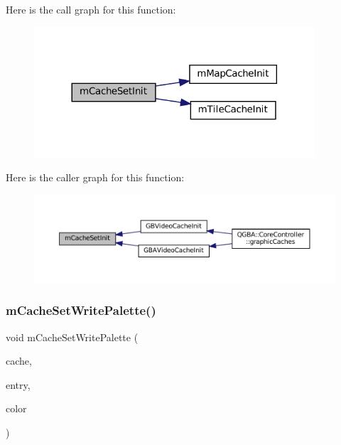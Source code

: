 Here is the call graph for this function\+:
\nopagebreak
\begin{figure}[H]
\begin{center}
\leavevmode
\includegraphics[width=296pt]{core_2cache-set_8c_a0082eccdfc7d350d0fb3092820f4bf95_cgraph}
\end{center}
\end{figure}
Here is the caller graph for this function\+:
\nopagebreak
\begin{figure}[H]
\begin{center}
\leavevmode
\includegraphics[width=350pt]{core_2cache-set_8c_a0082eccdfc7d350d0fb3092820f4bf95_icgraph}
\end{center}
\end{figure}
\mbox{\label{core_2cache-set_8c_a911c877cb6f25d98b07830de12a90dd5}} 
\subsubsection{\texorpdfstring{m\+Cache\+Set\+Write\+Palette()}{mCacheSetWritePalette()}}
{\footnotesize\ttfamily void m\+Cache\+Set\+Write\+Palette (\begin{DoxyParamCaption}\item[{struct m\+Cache\+Set $\ast$}]{cache,  }\item[{uint32\+\_\+t}]{entry,  }\item[{color\+\_\+t}]{color }\end{DoxyParamCaption})}

